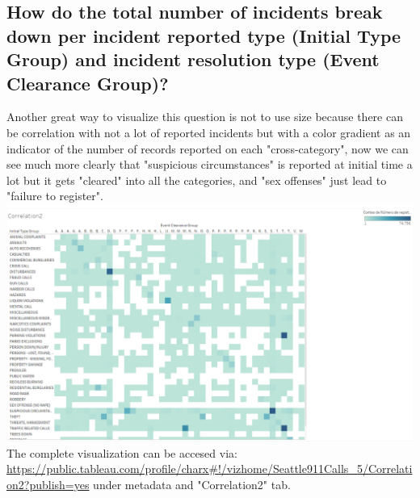 \documentclass{article}
\begin{document}
    \subsection{How	do the total number of incidents break down	per	incident reported type (Initial Type Group) and incident resolution type (Event Clearance Group)?}
    Another great way to visualize this question is not to use size because there can be correlation with not a lot of reported incidents but with a color gradient as an indicator of the number of records reported on each "cross-category", now we can see much more clearly that "suspicious circumstances" is reported at initial time a lot but it gets "cleared" into all the categories, and "sex offenses" just lead to "failure to register".
    \\
    \includegraphics[width=\textwidth]{VisualAnalytics/Assignment2/images/Correlation2.PNG}
    \\
    The complete visualization can be accesed via: \url{https://public.tableau.com/profile/charx#!/vizhome/Seattle911Calls_5/Correlation2?publish=yes} under metadata and "Correlation2" tab.
    \\
\end{document}
